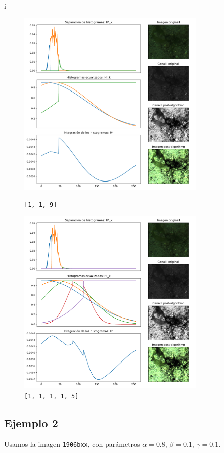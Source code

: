 i\begin{figure}[H]
\begin{minipage}[c]{0.48\linewidth}
  \includegraphics[height=9cm]{imgs/1906bxx-119.pdf}
  \caption{\texttt{[1, 1, 9]}}
\end{minipage}
\hfill
\begin{minipage}[c]{0.48\linewidth}
  \includegraphics[height=9cm]{imgs/1906bxx-11115.pdf}
  \caption{\texttt{[1, 1, 1, 1, 5]}}
\end{minipage}%
\end{figure}

\subsection{Ejemplo 2}
Usamos la imagen \texttt{1906bxx}, con parámetros $\alpha = 0.8$, $\beta = 0.1$, $\gamma = 0.1$.

